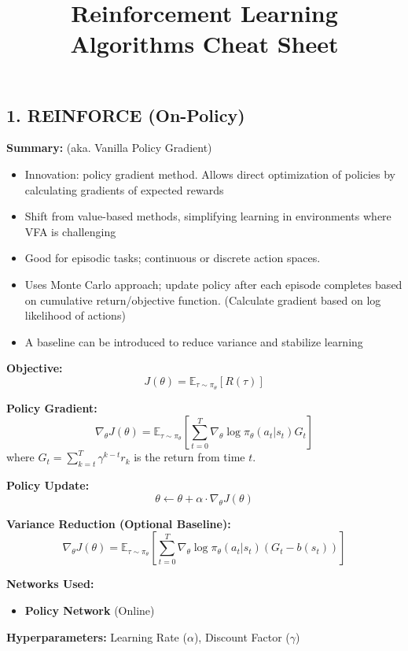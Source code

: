 \documentclass[letterpaper,10pt]{article}
\title{\vspace{-4cm}Reinforcement Learning Algorithms Cheat Sheet}
\author{}
\date{}
\begin{document}
\maketitle
\normalsize
\begin{multicols}{2}

\section*{1. REINFORCE (On-Policy)}
\textbf{Summary:} (aka. Vanilla Policy Gradient)
\begin{itemize}
    \item Innovation: policy gradient method. Allows direct optimization of policies by calculating gradients of expected rewards
    \item Shift from value-based methods, simplifying learning in environments where VFA is challenging
    \item Good for episodic tasks; continuous or discrete action spaces.
    \item Uses Monte Carlo approach; update policy after each episode completes based on cumulative return/objective function. (Calculate gradient based on log likelihood of actions)
    \item A baseline can be introduced to reduce variance and stabilize learning
\end{itemize}

\noindent \textbf{Objective:}
\[
J(\theta) = \mathbb{E}_{\tau \sim \pi_\theta} \left[ R(\tau) \right]
\]

\noindent \textbf{Policy Gradient:}
\[
\nabla_\theta J(\theta) = \mathbb{E}_{\tau \sim \pi_\theta} \left[ \sum_{t=0}^{T} \nabla_\theta \log \pi_\theta(a_t | s_t) G_t \right]
\]
where \( G_t = \sum_{k=t}^{T} \gamma^{k-t} r_k \) is the return from time \( t \).

\noindent \textbf{Policy Update:}
\[
\theta \leftarrow \theta + \alpha \cdot \nabla_\theta J(\theta)
\]

\noindent \textbf{Variance Reduction (Optional Baseline):}
\[
\nabla_\theta J(\theta) = \mathbb{E}_{\tau \sim \pi_\theta} \left[ \sum_{t=0}^{T} \nabla_\theta \log \pi_\theta(a_t | s_t) \left( G_t - b(s_t) \right) \right]
\]

\noindent \textbf{Networks Used:} 
\begin{itemize}
    \item \textbf{Policy Network} (Online)
\end{itemize}

\noindent \textbf{Hyperparameters: }Learning Rate (\(\alpha\)), Discount Factor (\(\gamma\))


\end{multicols}
\end{document}
